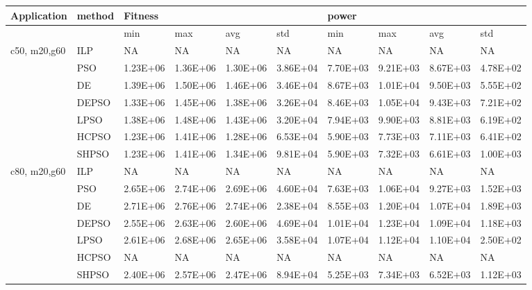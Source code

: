 \begin{adjustbox}{angle=90}
\small

\begin{tabular}{@{}llllllllll@{}}
\toprule
Application & method & Fitness &  &  &  & power &  &  &  \\ \midrule
 &  & min & max & avg & std & min & max & avg & std \\
c50, m20,g60 & ILP & NA & NA & NA & NA & NA & NA & NA & NA \\
 & PSO & 1.23E+06 & 1.36E+06 & 1.30E+06 & 3.86E+04 & 7.70E+03 & 9.21E+03 & 8.67E+03 & 4.78E+02 \\
 & DE & 1.39E+06 & 1.50E+06 & 1.46E+06 & 3.46E+04 & 8.67E+03 & 1.01E+04 & 9.50E+03 & 5.55E+02 \\
 & DEPSO & 1.33E+06 & 1.45E+06 & 1.38E+06 & 3.26E+04 & 8.46E+03 & 1.05E+04 & 9.43E+03 & 7.21E+02 \\
 & LPSO & 1.38E+06 & 1.48E+06 & 1.43E+06 & 3.20E+04 & 7.94E+03 & 9.90E+03 & 8.81E+03 & 6.19E+02 \\
 & HCPSO & 1.23E+06 & 1.41E+06 & 1.28E+06 & 6.53E+04 & 5.90E+03 & 7.73E+03 & 7.11E+03 & 6.41E+02 \\
 & SHPSO & 1.23E+06 & 1.41E+06 & 1.34E+06 & 9.81E+04 & 5.90E+03 & 7.32E+03 & 6.61E+03 & 1.00E+03 \\
c80, m20,g60 & ILP & NA & NA & NA & NA & NA & NA & NA & NA \\
 & PSO & 2.65E+06 & 2.74E+06 & 2.69E+06 & 4.60E+04 & 7.63E+03 & 1.06E+04 & 9.27E+03 & 1.52E+03 \\
 & DE & 2.71E+06 & 2.76E+06 & 2.74E+06 & 2.38E+04 & 8.55E+03 & 1.20E+04 & 1.07E+04 & 1.89E+03 \\
 & DEPSO & 2.55E+06 & 2.63E+06 & 2.60E+06 & 4.69E+04 & 1.01E+04 & 1.23E+04 & 1.09E+04 & 1.18E+03 \\
 & LPSO & 2.61E+06 & 2.68E+06 & 2.65E+06 & 3.58E+04 & 1.07E+04 & 1.12E+04 & 1.10E+04 & 2.50E+02 \\
 & HCPSO & NA & NA & NA & NA & NA & NA & NA & NA \\
 & SHPSO & 2.40E+06 & 2.57E+06 & 2.47E+06 & 8.94E+04 & 5.25E+03 & 7.34E+03 & 6.52E+03 & 1.12E+03 \\ \bottomrule
\end{tabular}
\end{adjustbox}